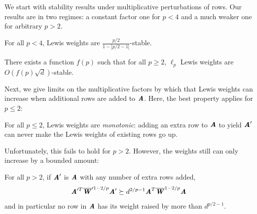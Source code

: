We start with stability results under multiplicative perturbations of rows.
Our results are in two regimes: a constant factor one for $p < 4$ and
a much weaker one for arbitrary $p > 2$.

\begin{lemma}
\label{lem:fullstable}
For all $p < 4$, Lewis weights are $\frac{p/2}{1 - |p/2 - 1|}$-stable.
\end{lemma}

\begin{lemma}
\label{lem:sqrtstable}
There exists a function $f(p)$ such that for all $p \geq 2$, $\ell_p$ Lewis weights are $O(f(p) \sqrt{d})$-stable.
\end{lemma}

Next, we give limits on the multiplicative factors by which that Lewis weights
can increase when additional rows are added to $\AA$.
Here, the best property applies for $p \leq 2$:

\begin{lemma}
\label{lem:fullmonotone}
For all $p \leq 2$, Lewis weights are \emph{monotonic}: adding an extra row to $\AA$
to yield $\AA'$ can never make the Lewis weights of existing rows go up.
\end{lemma}

Unfortunately, this fails to hold for $p > 2$.  However, the weights still can only increase by a bounded amount:
\begin{lemma}
\label{lem:weakmonotone}
For all $p > 2$, if $\AA'$ is $\AA$ with any number of extra rows added,
\begin{equation*}
\AA'^T \WWbar'^{1 - 2/p} \AA' \succeq d^{2/p - 1} \AA^T \WWbar^{1 - 2/p} \AA
\end{equation*}
and in particular no row in $\AA$ has its weight raised by more than $d^{p/2-1}$.
\end{lemma}
